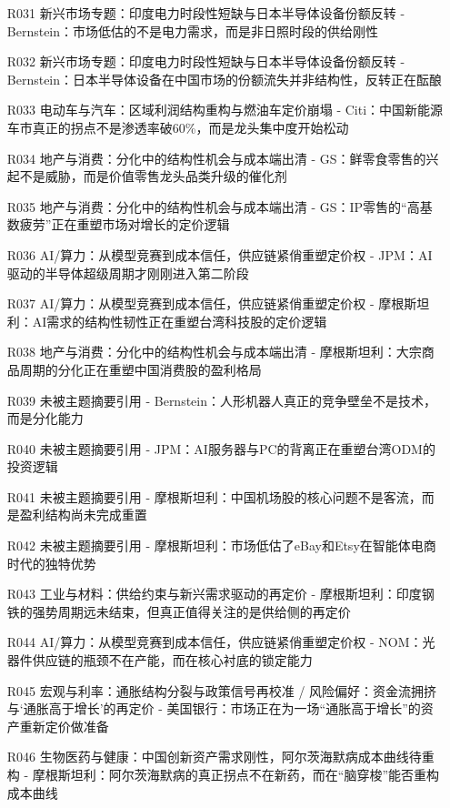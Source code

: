 \documentclass[11pt]{ctexart}
\begin{document}
\begin{itemize}
  \item [R031] 新兴市场专题：印度电力时段性短缺与日本半导体设备份额反转 - Bernstein：市场低估的不是电力需求，而是非日照时段的供给刚性
  \item [R032] 新兴市场专题：印度电力时段性短缺与日本半导体设备份额反转 - Bernstein：日本半导体设备在中国市场的份额流失并非结构性，反转正在酝酿
  \item [R033] 电动车与汽车：区域利润结构重构与燃油车定价崩塌 - Citi：中国新能源车市真正的拐点不是渗透率破60\%，而是龙头集中度开始松动
  \item [R034] 地产与消费：分化中的结构性机会与成本端出清 - GS：鲜零食零售的兴起不是威胁，而是价值零售龙头品类升级的催化剂
  \item [R035] 地产与消费：分化中的结构性机会与成本端出清 - GS：IP零售的“高基数疲劳”正在重塑市场对增长的定价逻辑
  \item [R036] AI/算力：从模型竞赛到成本信任，供应链紧俏重塑定价权 - JPM：AI驱动的半导体超级周期才刚刚进入第二阶段
  \item [R037] AI/算力：从模型竞赛到成本信任，供应链紧俏重塑定价权 - 摩根斯坦利：AI需求的结构性韧性正在重塑台湾科技股的定价逻辑
  \item [R038] 地产与消费：分化中的结构性机会与成本端出清 - 摩根斯坦利：大宗商品周期的分化正在重塑中国消费股的盈利格局
  \item [R039] 未被主题摘要引用 - Bernstein：人形机器人真正的竞争壁垒不是技术，而是分化能力
  \item [R040] 未被主题摘要引用 - JPM：AI服务器与PC的背离正在重塑台湾ODM的投资逻辑
  \item [R041] 未被主题摘要引用 - 摩根斯坦利：中国机场股的核心问题不是客流，而是盈利结构尚未完成重置
  \item [R042] 未被主题摘要引用 - 摩根斯坦利：市场低估了eBay和Etsy在智能体电商时代的独特优势
  \item [R043] 工业与材料：供给约束与新兴需求驱动的再定价 - 摩根斯坦利：印度钢铁的强势周期远未结束，但真正值得关注的是供给侧的再定价
  \item [R044] AI/算力：从模型竞赛到成本信任，供应链紧俏重塑定价权 - NOM：光器件供应链的瓶颈不在产能，而在核心衬底的锁定能力
  \item [R045] 宏观与利率：通胀结构分裂与政策信号再校准 / 风险偏好：资金流拥挤与‘通胀高于增长’的再定价 - 美国银行：市场正在为一场“通胀高于增长”的资产重新定价做准备
  \item [R046] 生物医药与健康：中国创新资产需求刚性，阿尔茨海默病成本曲线待重构 - 摩根斯坦利：阿尔茨海默病的真正拐点不在新药，而在“脑穿梭”能否重构成本曲线
\end{itemize}
\end{document}

